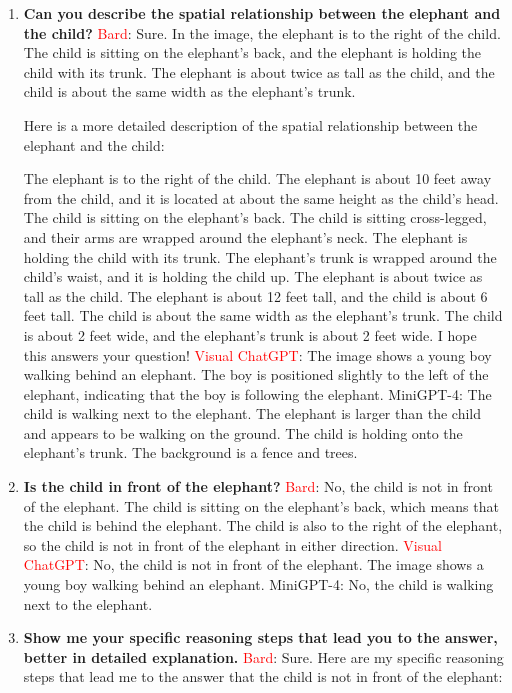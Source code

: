     \begin{enumerate}
        \item \textbf{Can you describe the spatial relationship between the elephant and the child?}
        \subitem \textcolor{Red}{Bard}:
        Sure. In the image, the elephant is to the right of the child. The child is sitting on the elephant's back, and the elephant is holding the child with its trunk. The elephant is about twice as tall as the child, and the child is about the same width as the elephant's trunk.
        
        Here is a more detailed description of the spatial relationship between the elephant and the child:
        
        The elephant is to the right of the child. The elephant is about 10 feet away from the child, and it is located at about the same height as the child's head.
        The child is sitting on the elephant's back. The child is sitting cross-legged, and their arms are wrapped around the elephant's neck.
        The elephant is holding the child with its trunk. The elephant's trunk is wrapped around the child's waist, and it is holding the child up.
        The elephant is about twice as tall as the child. The elephant is about 12 feet tall, and the child is about 6 feet tall.
        The child is about the same width as the elephant's trunk. The child is about 2 feet wide, and the elephant's trunk is about 2 feet wide.
        I hope this answers your question!
        \subitem \textcolor{red}{Visual ChatGPT}: The image shows a young boy walking behind an elephant. The boy is positioned slightly to the left of the elephant, indicating that the boy is following the elephant.
        \subitem MiniGPT-4: The child is walking next to the elephant. The elephant is larger than the child and appears to be walking on the ground. The child is holding onto the elephant’s trunk. The background is a fence and trees.
        \item \textbf{Is the child in front of the elephant?}
        \subitem \textcolor{Red}{Bard}: 
        No, the child is not in front of the elephant. The child is sitting on the elephant's back, which means that the child is behind the elephant. The child is also to the right of the elephant, so the child is not in front of the elephant in either direction.
        \subitem \textcolor{red}{Visual ChatGPT}: No, the child is not in front of the elephant. The image shows a young boy walking behind an elephant.
        \subitem MiniGPT-4: No, the child is walking next to the elephant.
        \item \textbf{Show me your specific reasoning steps that lead you to the answer, better in detailed explanation.}
        \subitem \textcolor{Red}{Bard}:
        Sure. Here are my specific reasoning steps that lead me to the answer that the child is not in front of the elephant:


\end{enumerate}
